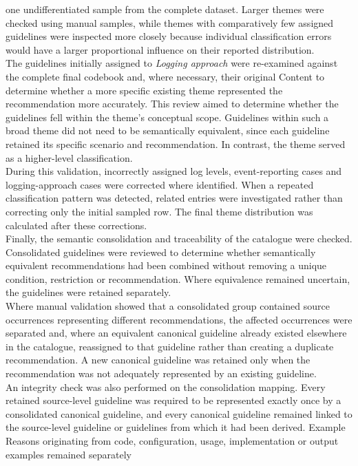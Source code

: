 one undifferentiated sample from the complete dataset. Larger themes were checked using
manual samples, while themes with comparatively few assigned guidelines were inspected
more closely because individual classification errors would have a larger proportional
influence on their reported distribution.
\\
The guidelines initially assigned to \textit{Logging approach} were re-examined against 
the complete final codebook and, where necessary, their original Content to determine 
whether a more specific existing theme represented the recommendation more accurately. 
This review aimed to determine whether the guidelines fell within the theme's conceptual scope. 
Guidelines within such a broad theme did not need to be semantically equivalent, 
since each guideline retained its specific scenario and recommendation.
In contrast, the theme served as a higher-level classification.
\\
During this validation, incorrectly assigned log levels, event-reporting cases and
logging-approach cases were corrected where identified. When a repeated classification
pattern was detected, related entries were investigated rather than correcting only the
initial sampled row. The final theme distribution was calculated after these corrections.
\\
Finally, the semantic consolidation and traceability of the catalogue were checked.
Consolidated guidelines were reviewed to determine whether semantically equivalent
recommendations had been combined without removing a unique condition, restriction or
recommendation. Where equivalence remained uncertain, the guidelines were retained
separately.
\\
Where manual validation showed that a consolidated group contained source occurrences
representing different recommendations, the affected occurrences were separated and,
where an equivalent canonical guideline already existed elsewhere in the catalogue, 
reassigned to that guideline rather than creating a duplicate recommendation.
A new canonical guideline was retained only when the recommendation was not adequately
represented by an existing guideline.
\\
An integrity check was also performed on the consolidation mapping. Every retained
source-level guideline was required to be represented exactly once by a consolidated
canonical guideline, and every canonical guideline remained linked to the source-level
guideline or guidelines from which it had been derived. Example Reasons originating
from code, configuration, usage, implementation or output examples remained separately
